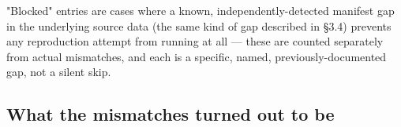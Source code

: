 \begin{table}[t]\centering
{}
\caption{Selection-reproduction results by election. \label{tab:selection-reproduction}}
\end{table}

"Blocked" entries are cases where a known, independently-detected manifest
gap in the underlying source data (the same kind of gap described in §3.4)
prevents any reproduction attempt from running at all — these are counted
separately from actual mismatches, and each is a specific, named,
previously-documented gap, not a silent skip.

\subsection{What the mismatches turned out to be}

